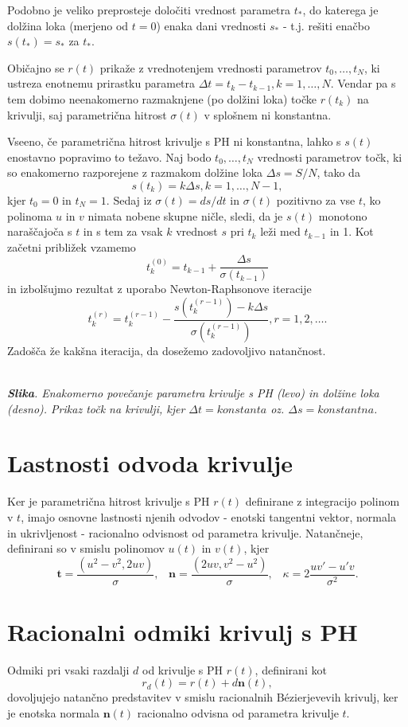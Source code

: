 \documentclass[a4paper]{article}
\begin{document}
	Podobno je veliko preprosteje določiti vrednost parametra $t_*$, do katerega je dolžina loka (merjeno od $t = 0$) enaka dani vrednosti $s_*$ - t.j. rešiti enačbo $s (t_*) = s_*$ za $t_*$.
	
	Običajno se $r (t)$ prikaže z vrednotenjem vrednosti parametrov $t_0,\ldots , t_N$, ki ustreza enotnemu prirastku parametra $\Delta t = t_k- t_{k- 1}, k = 1,\ldots , N$. Vendar pa s tem dobimo neenakomerno razmaknjene (po dolžini loka) točke $r (t_k)$ na krivulji, saj parametrična hitrost $\sigma (t)$ v splošnem ni konstantna.
	
	Vseeno, če parametrična hitrost krivulje s PH ni konstantna, lahko s $s (t)$ enostavno popravimo to težavo. Naj bodo $t_0,\ldots, t_N$ vrednosti parametrov točk, ki so enakomerno razporejene z razmakom dolžine loka $\Delta s = S / N$, tako da
	$$s (t_k) = k\Delta s, k = 1,\ldots , N - 1,$$
	kjer $t_0 = 0$ in $t_N = 1$. Sedaj iz $\sigma (t) = ds / dt$ in $\sigma (t)$ pozitivno za vse $t$, ko polinoma $u$ in $v$ nimata nobene skupne ničle, sledi, da je $s (t)$ monotono naraščajoča s $t$ in s tem za vsak $k$ vrednost $s$ pri $t_k$ leži med $t_{k - 1}$ in 1. Kot začetni približek vzamemo
	$$t^{(0)}_k = t_{k-1}+\frac{\Delta s}{\sigma(t_{k-1})}$$
	in izbolšujmo rezultat z uporabo Newton-Raphsonove iteracije
	$$t^{(r)}_k = t^{(r-1)}_k-\frac{s(t^{(r-1)}_k)-k\Delta s}{\sigma(t^{(r-1)}_k)}, r = 1, 2,\ldots.$$
	Zadošča že kakšna iteracija, da dosežemo zadovoljivo natančnost.
	
	
	\textit{\\ \textbf{Slika}. Enakomerno povečanje parametra krivulje s PH (levo) in dolžine loka (desno). Prikaz točk na krivulji, kjer $\Delta t = konstanta$ oz. $\Delta s = konstantna$.}
	
	\section{Lastnosti odvoda krivulje}
	Ker je parametrična hitrost krivulje s PH $r (t)$ definirane z integracijo polinom v $t$, imajo osnovne lastnosti njenih odvodov - enotski tangentni vektor, normala in ukrivljenost - racionalno odvisnost od parametra krivulje. Natančneje, definirani so v smislu polinomov $u (t)$ in $v (t)$, kjer
	$$\textbf{t} =\frac{(u^2 - v^2, 2uv)}{\sigma},\hspace{10pt} \textbf{n} =\frac{(2uv, v^2 - u^2)}{\sigma},\hspace{10pt} \kappa = 2 \frac{uv\prime - u\prime v}{\sigma^2}.$$
	
	\section{Racionalni odmiki krivulj s PH}
	Odmiki pri vsaki razdalji $d$ od krivulje s PH $r (t)$, definirani kot
	$$r_d (t) = r (t) + d \textbf{n} (t),$$
	dovoljujejo natančno predstavitev v smislu racionalnih B\'ezierjevevih krivulj, ker je enotska normala $\textbf{n} (t)$ racionalno odvisna od parametra krivulje $t$. 
	
\end{document}
